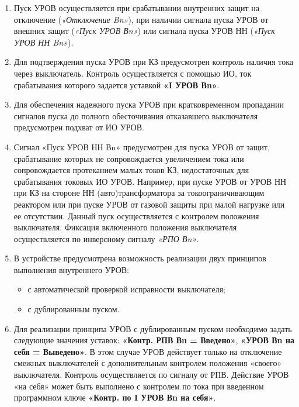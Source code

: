 \begin{enumerate}[label=\arabic{section}.\arabic{subsection}.\arabic{enumi}, labelsep=4pt, leftmargin=0pt, itemindent=57pt, itemsep=0pt, parsep=5pt]
\begin{enumerate}[label=\arabic{section}.\arabic{subsection}.\arabic{enumi}.\arabic*, labelsep=4pt, leftmargin=0em, itemindent=65pt, parsep=0pt]
\item
Пуск УРОВ осуществляется при срабатывании внутренних защит на отключение (\textit{«Отключение Bn»}), при наличии сигнала пуска УРОВ от внешних защит (\textit{«Пуск УРОВ Вn»}) или сигнала пуска УРОВ НН (\textit{«Пуск УРОВ НН Bn»}).

\item
Для подтверждения пуска УРОВ при КЗ предусмотрен контроль наличия тока через выключатель.
Контроль осуществляется с помощью ИО, ток срабатывания которого задается уставкой \textbf{«I УРОВ Вn»}.

\item
Для обеспечения надежного пуска УРОВ при кратковременном пропадании сигналов пуска до полного обесточивания отказавшего выключателя предусмотрен подхват от ИО УРОВ.

\item
Сигнал «Пуск УРОВ НН Вn» предусмотрен для пуска УРОВ от защит, срабатывание которых не сопровождается увеличением тока или сопровождается протеканием малых токов КЗ, недостаточных для срабатывания токовых ИО УРОВ.
Например, при пуске УРОВ от УРОВ НН при КЗ на стороне НН (авто)трансформатора за токоограничивающим реактором или при пуске УРОВ от газовой защиты при малой нагрузке или ее отсутствии.
Данный пуск осуществляется с контролем положения выключателя.
Фиксация включенного положения выключателя осуществляется по инверсному сигналу \textit{«РПО Вn»}.

\item
В устройстве предусмотрена возможность реализации двух принципов выполнения внутреннего УРОВ:
\begin{itemize}
\item с автоматической проверкой исправности выключателя;
\item с дублированным пуском.
\end{itemize}

\item
Для реализации принципа УРОВ с дублированным пуском необходимо задать следующие значения уставок: \textbf{«Контр. РПВ Вn = Введено»}, \textbf{«УРОВ Вn на себя = Выведено»}.
В этом случае УРОВ действует только на отключение смежных выключателей с дополнительным контролем положения «своего» выключателя.
Контроль осуществляется по сигналу от РПВ.
Действие УРОВ «на себя» может быть выполнено с контролем по тока при введенном программном ключе \textbf{«Контр. по I УРОВ Вn на себя»}.


\end{enumerate}
\end{enumerate}
